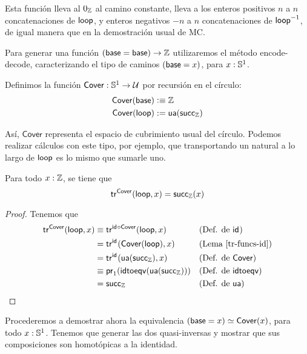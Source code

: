 \documentclass[../main.tex]{subfiles}
\begin{document}
Esta funci\'on lleva al $0_\mathbb{Z}$ al camino constante, lleva a los enteros positivos $n$ a $n$ concatenaciones de $\mathsf{loop}$, y enteros negativos $-n$ a $n$ concatenaciones de $\mathsf{loop}^{-1}$, de igual manera que en la demostraci\'on usual de MC.

Para generar una funci\'on $(\mathsf{base} = \mathsf{base}) \to \mathbb{Z}$ utilizaremos el m\'etodo encode-decode, caracterizando el tipo de caminos $(\mathsf{base} = x)$, para $x:\mathbb{S}^1$.

\begin{definition}
  Definimos la funci\'on $\mathsf{Cover} : \mathbb{S}^1 \to \mathcal{U}$ por recursi\'on en el c\'irculo:
  \begin{align*}
    \mathsf{Cover}(\mathsf{base})  & \vcentcolon\equiv \mathbb{Z}       \\
    \mathsf{Cover}(\mathsf{loop}) & := \mathsf{ua}(\mathsf{succ}_\mathbb{Z})
  \end{align*}
\end{definition}

As\'i, $\mathsf{Cover}$ representa el espacio de cubrimiento usual del c\'irculo.
Podemos realizar c\'alculos con este tipo, por ejemplo, que transportando un natural a lo largo de $\mathsf{loop}$ es lo mismo que sumarle uno.

\begin{lemma}\label{tr-Cover-loop}
  Para todo $x:\mathbb{Z}$, se tiene que
  \[ \mathsf{tr}^{\mathsf{Cover}}(\mathsf{loop},x) = \mathsf{succ}_\mathbb{Z}(x) \]
\end{lemma}
\begin{proof}
  Tenemos que
  \begin{align*}
    \mathsf{tr}^{\mathsf{Cover}}(\mathsf{loop},x)
     & \equiv \mathsf{tr}^{\mathsf{id}_{}\circ \mathsf{Cover}}(\mathsf{loop},x) &  & \text{(Def. de \ensuremath{\mathsf{id}_{}})}          \\
     & = \mathsf{tr}^{\mathsf{id}_{}}(\mathsf{Cover}(\mathsf{loop}),x)         &  & \text{(Lema \ref{tr-funcs-id})}   \\
     & = \mathsf{tr}^{\mathsf{id}_{}}(\mathsf{ua}(\mathsf{succ}_\mathbb{Z}),x)                   &  & \text{(Def. de $\mathsf{Cover}$)} \\
     & \equiv \mathsf{pr}_{1} (\mathsf{idtoeqv} (\mathsf{ua}(\mathsf{succ}_\mathbb{Z})))                 &  & \text{(Def. de \ensuremath{\mathsf{idtoeqv}})}         \\
     & = \mathsf{succ}_\mathbb{Z}                                            &  & \text{(Def. de \ensuremath{\mathsf{ua}})}
  \end{align*}
\end{proof}

Procederemos a demostrar ahora la equivalencia $(\mathsf{base} = x) \simeq \mathsf{Cover}(x)$, para todo $x:\mathbb{S}^1$. Tenemos que generar las dos quasi-inversas y mostrar que sus composiciones son homot\'opicas a la identidad.
\end{document}
